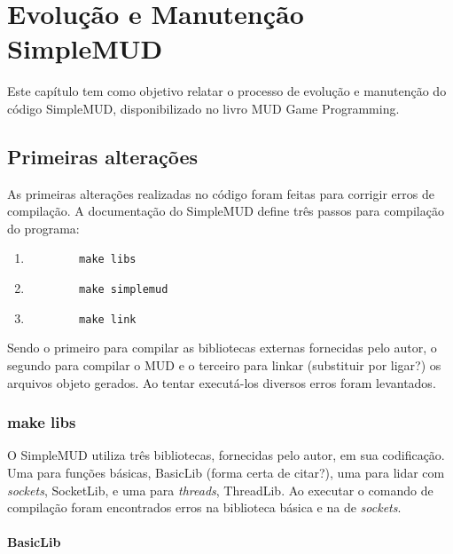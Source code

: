 \chapter[Evolução e Manutenção SimpleMUD]{Evolução e Manutenção SimpleMUD}

Este capítulo tem como objetivo relatar o processo de evolução e manutenção do código SimpleMUD, 
disponibilizado no livro MUD Game Programming.

\section{Primeiras alterações}

As primeiras alterações realizadas no código foram feitas para corrigir erros de compilação. 
A documentação do SimpleMUD define três passos para compilação do programa:

\begin{enumerate}
    \item \begin{lstlisting}
        make libs
    \end{lstlisting}
    \item \begin{lstlisting}
        make simplemud
    \end{lstlisting}
    \item \begin{lstlisting}
        make link
    \end{lstlisting}
\end{enumerate}

Sendo o primeiro para compilar as bibliotecas externas fornecidas pelo autor, 
o segundo para compilar o MUD e o terceiro para linkar (substituir por ligar?) 
os arquivos objeto gerados. Ao tentar executá-los diversos erros foram levantados.

\subsection{make libs}

O SimpleMUD utiliza três bibliotecas, fornecidas pelo autor, em sua codificação. 
Uma para funções básicas, BasicLib (forma certa de citar?), uma para lidar com \textit{sockets}, 
SocketLib, e uma para \textit{threads}, ThreadLib. Ao executar o comando de compilação 
foram encontrados erros na biblioteca básica e na de \textit{sockets}.

\subsubsection{BasicLib}

